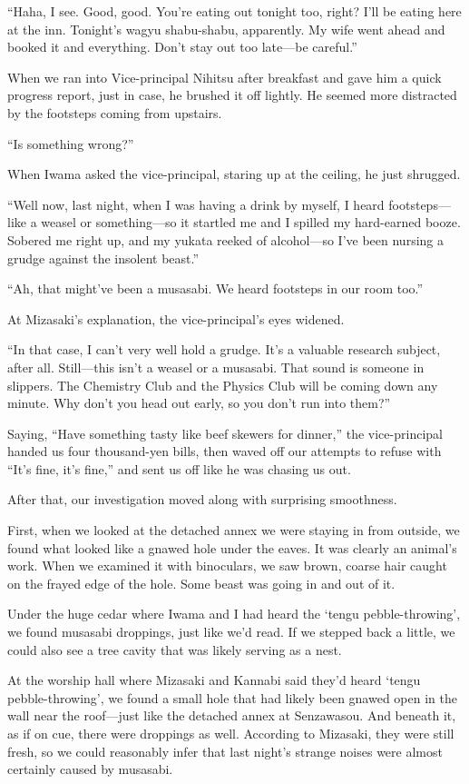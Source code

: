 \documentclass[
    a4paper,
    12pt,
    twoside,
    openany,
    UTF8,
    fontset=windows
]{ctexbook}
\begin{document}
``Haha, I see. Good, good. You're eating out tonight too, right? I'll be eating here at the inn. Tonight's wagyu shabu-shabu, apparently. My wife went ahead and booked it and everything. Don't stay out too late---be careful.''

When we ran into Vice-principal Nihitsu after breakfast and gave him a quick progress report, just in case, he brushed it off lightly. He seemed more distracted by the footsteps coming from upstairs.

``Is something wrong?''

When Iwama asked the vice-principal, staring up at the ceiling, he just shrugged.

``Well now, last night, when I was having a drink by myself, I heard footsteps---like a weasel or something---so it startled me and I spilled my hard-earned booze. Sobered me right up, and my yukata reeked of alcohol---so I've been nursing a grudge against the insolent beast.''

``Ah, that might've been a musasabi. We heard footsteps in our room too.''

At Mizasaki's explanation, the vice-principal's eyes widened.

``In that case, I can't very well hold a grudge. It's a valuable research subject, after all. Still---this isn't a weasel or a musasabi. That sound is someone in slippers. The Chemistry Club and the Physics Club will be coming down any minute. Why don't you head out early, so you don't run into them?''

Saying, ``Have something tasty like beef skewers for dinner,'' the vice-principal handed us four thousand-yen bills, then waved off our attempts to refuse with ``It's fine, it's fine,'' and sent us off like he was chasing us out.

After that, our investigation moved along with surprising smoothness.

First, when we looked at the detached annex we were staying in from outside, we found what looked like a gnawed hole under the eaves. It was clearly an animal's work. When we examined it with binoculars, we saw brown, coarse hair caught on the frayed edge of the hole. Some beast was going in and out of it.

Under the huge cedar where Iwama and I had heard the `tengu pebble-throwing', we found musasabi droppings, just like we'd read. If we stepped back a little, we could also see a tree cavity that was likely serving as a nest.

At the worship hall where Mizasaki and Kannabi said they'd heard `tengu pebble-throwing', we found a small hole that had likely been gnawed open in the wall near the roof---just like the detached annex at Senzawasou. And beneath it, as if on cue, there were droppings as well. According to Mizasaki, they were still fresh, so we could reasonably infer that last night's strange noises were almost certainly caused by musasabi.
\end{document}
